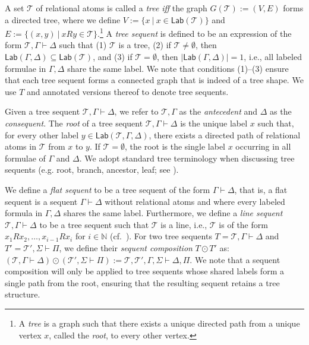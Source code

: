 \documentclass[copyright,creativecommons]{eptcs}
\newcommand{\tel}{\mathcal{T}}
\newcommand{\iffi}{\textit{iff} }
\newcommand{\lab}{\mathsf{Lab}}
\newcommand{\sar}{\vdash}
\newcommand{\tseq}{T} %
\newcommand{\scomp}{\odot}
\begin{document}
A set $\tel$ of relational atoms is called a \emph{tree} \iffi the graph $G(\tel) := (V,E)$ forms a directed tree, where we define $V := \{x \ | \ x \in \lab(\tel)\}$ and $E := \{(x,y) \ | \ xRy \in \tel\}$.\footnote{A \emph{tree} is a graph such that there exists a unique directed path from a unique vertex $x$, called the \emph{root}, to every other vertex.} A \emph{tree sequent} is defined to be an expression of the form $\tel, \Gamma \sar \Delta$ such that (1) $\tel$ is a tree, (2) if $\tel \neq \emptyset$, then $\lab(\Gamma, \Delta) \subseteq \lab(\tel)$, and (3) if $\tel = \emptyset$, then $|\lab(\Gamma,\Delta)| = 1$, i.e., all labeled formulae in $\Gamma, \Delta$ share the same label. We note that conditions (1)--(3) ensure that each tree sequent forms a connected graph that is indeed of a tree shape. We use $\tseq$ and annotated versions thereof to denote tree sequents. 

Given a tree sequent $\tel, \Gamma \sar \Delta$, we refer to $\tel, \Gamma$ as the \emph{antecedent} and $\Delta$ as the \emph{consequent}. %
The \emph{root} of a tree sequent $\tel, \Gamma \sar \Delta$ is the unique label $x$ such that, for every other label $y \in \lab(\tel,\Gamma,\Delta)$, there exists a directed path of relational atoms in $\tel$ from $x$ to $y$. If $\tel = \emptyset$, the root is the single label $x$ occurring in all formulae of $\Gamma$ and $\Delta$. We adopt standard tree terminology when discussing tree sequents (e.g. root, branch, ancestor, leaf; see \cite[Chapter 11]{Ros19}).

We define a \emph{flat sequent} to be a tree sequent of the form $\Gamma \sar \Delta$, that is, a flat sequent is a sequent $\Gamma \sar \Delta$ without relational atoms and where every labeled formula in $\Gamma,\Delta$ shares the same label. Furthermore, we define a \emph{line sequent} $\tel, \Gamma \sar \Delta$ to be a tree sequent such that $\tel$ is a line, i.e., $\tel$ is of the form $x_{1}Rx_{2}, \ldots, x_{i{-}1}Rx_{i}$ for $i \in \mathbb{N}$ (cf.~\cite{LelPim15}). For two tree sequents $\tseq = \tel, \Gamma \sar \Delta$ and $\tseq' = \tel', \Sigma \sar \Pi$, we define their \emph{sequent composition} $\tseq \scomp \tseq'$ as: $(\tel, \Gamma \sar \Delta) \scomp (\tel', \Sigma \sar \Pi) := \tel, \tel', \Gamma, \Sigma \sar \Delta, \Pi.$ We note that a sequent composition will only be applied to tree
sequents whose shared labels form a single path from the root,
ensuring that the resulting sequent retains a tree structure.
\end{document}
